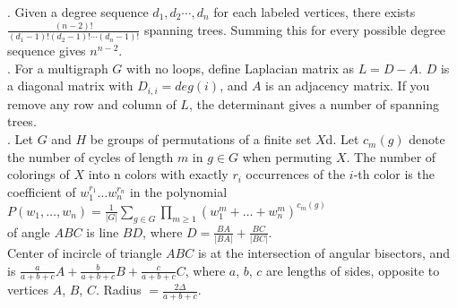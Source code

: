  

 
 
 

. Given a degree sequence $d_1, d_2 \cdots, d_n$ for each labeled vertices, there exists $\frac{(n-2)!}{(d_1 - 1)!(d_2 - 1)! \cdots (d_n - 1)!}$ spanning trees. Summing this for every possible degree sequence gives $n^{n-2}$. \\

. For a multigraph $G$ with no loops, define Laplacian matrix as $L = D - A$. $D$ is a diagonal matrix with $D_{i, i} = deg(i)$, and $A$ is an adjacency matrix. If you remove any row and column of $L$, the determinant gives a number of spanning trees.\\

. Let $G$ and $H$ be groups of permutations of a finite set $X$d. Let $c_m(g)$ denote the number of cycles of length $m$ in $g \in G$ when permuting $X$. The number of colorings of $X$ into n colors with exactly $r_i$ occurrences of the $i$-th color is the coefficient of $w_1^{r_1}\ldots w_n^{r_n}$ in the polynomial $P(w_1,\ldots ,w_n)=\frac{1}{|G|}\sum_{g\in G}\prod_{m \ge 1}(w_1^m + \ldots +w_n^m)^{c_m(g)}$ \\
 
 of angle $ABC$ is line $BD$, where $D = \frac{BA}{|BA|} + \frac{BC}{|BC|}$. \\
Center of incircle of triangle $ABC$ is at the intersection of angular
bisectors, and is $\frac{a}{a+b+c} A + \frac{b}{a+b+c} B + \frac{c}{a+b+c} C$,
where $a$, $b$, $c$ are lengths of sides, opposite to vertices $A$, $B$, $C$.
Radius $= \frac{2\Delta}{a+b+c}$.
 
